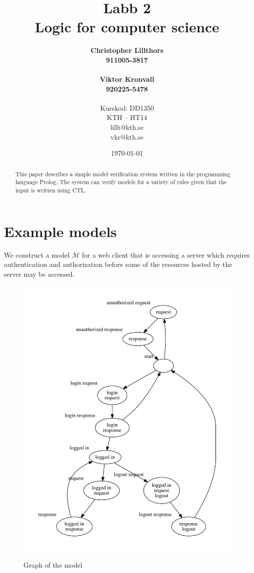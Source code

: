 \documentclass[a4paper,11pt]{article}
\title{Labb 2 \\ Logic for computer science}
\author{
  {\bf Christopher Lillthors}\\
  \textbf{911005-3817} \\\\
  {\bf Viktor Kronvall}\\
  \textbf{920225-5478}\\
  \\
  Kurskod: DD1350\\
  KTH -- HT14\\
  lillt@kth.se\\
  vkr@kth.se
}
\date{\today}
\begin{document}


\maketitle
\thispagestyle{empty}
\begin{abstract}

This paper describes a simple model verification system written in the programming language Prolog.
The system can verify models for a variety of rules given that the input is written using CTL.
\end{abstract}
\renewcommand{\arraystretch}{1.2}
\newpage
\thispagestyle{empty}
\tableofcontents
\newpage
\clearpage
\setcounter{page}{1}

\section{Example models}
\label{models}
We construct a model $\mathcal{M}$ for a web client that is accessing a server which requires authentication and authorization
before some of the resources hosted by the server may be accessed.
\begin{figure}[ht]
\caption{Graph of the model}
\includegraphics[scale=0.6]{model.pdf}
\label{fig:graph}
\end{figure}
\end{document}

